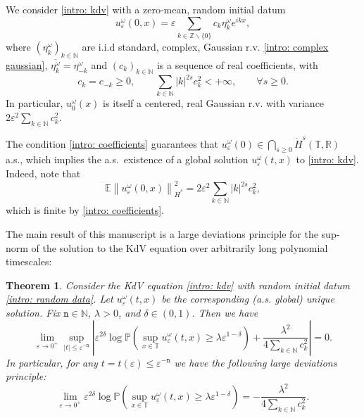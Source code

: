 \documentclass[a4paper,10pt,reqno]{article}
\theoremstyle{definition}
\theoremstyle{plain}
\newtheorem{theorem}[definition]{Theorem}
\theoremstyle{plain}
\theoremstyle{definition}
\theoremstyle{plain}
\theoremstyle{plain}
\theoremstyle{plain}
\theoremstyle{definition}
\theoremstyle{definition}
\newcommand{\norm}[1]{\left\lVert #1 \right\rVert}
\def \N{\mathbb N}
\def \Z{\mathbb Z}
\def \R{\mathbb R}
\def \P{{\mathbb P}}
\def \T{\mathbb{T}}
\def \E{\mathbb{E}}
\def \tn{\mathtt{n}}
\begin{document}
We consider \eqref{intro: kdv} with a zero-mean, random initial datum
\begin{equation} \label{intro: random data}
u_{\varepsilon}^{\omega}(0,x) = \varepsilon \sum_{k \in \Z \smallsetminus \{ 0 \}} c_k \eta_k^{\omega} e^{ikx},
\end{equation}
where $(\eta_k^{\omega})_{k \in \N}$ are i.i.d standard, complex, Gaussian r.v. \eqref{intro: complex gaussian}, $\overline{\eta_k^{\omega}} = \eta_{-k}^{\omega}$ and $(c_k)_{k \in \N}$ is a sequence of real coefficients, with
\begin{equation} \label{intro: coefficients}
c_k = c_{-k}\geq 0, \qquad \sum_{k \in \N} |k|^{2s} c_k^2 < +\infty, \qquad \forall s \ge 0.
\end{equation}
In particular, $u_0^{\omega}(x)$ is itself a centered, real Gaussian r.v. with variance $2\varepsilon^2 \sum_{k\in\N} c_k^2$.

\smallskip

The condition \eqref{intro: coefficients} guarantees that $u_{\varepsilon}^{\omega}(0)\in\bigcap_{s\geq 0} \dot{H}^s(\T,\R)$ a.s., which implies the a.s.~existence of a global solution $u_{\varepsilon}^{\omega}(t,x)$ to \eqref{intro: kdv}. Indeed, note that 
\begin{equation} \label{intro: average norm} 
\E \norm{u_{\varepsilon}^{\omega}(0,x)}_{\dot{H}^s}^2 = 2 \varepsilon^2 \sum_{k \in \N} |k|^{2s} c_k^2 ,
\end{equation}
which is finite by \eqref{intro: coefficients}.

\medskip

The main result of this manuscript is a large deviations principle for the sup-norm of the solution to the KdV equation over arbitrarily long polynomial timescales:

\begin{theorem} \label{thm:main_intro}
Consider the KdV equation  \eqref{intro: kdv} with random initial datum \eqref{intro: random data}. Let $u_{\varepsilon}^{\omega}(t,x)$ be the corresponding (a.s. global) unique solution.  Fix $\tn \in \N$, $\lambda > 0$, and $\delta \in (0,1)$. Then we have
\begin{equation} 
\lim_{\varepsilon\to 0^{+}} \sup_{|t|\leq \varepsilon^{-\tn}} \left \lvert \varepsilon^{2\delta} \log \P \left( \sup_{x \in \T} u_{\varepsilon}^{\omega}(t,x) \ge \lambda \varepsilon^{1-\delta} \right) +  \frac{\lambda^2}{4 \sum_{k\in\N} c_k^2} \right \rvert = 0.
\end{equation}
In particular, for any $t=t(\varepsilon)\leq \varepsilon^{-\tn}$ we have the following large deviations principle:
\begin{equation} \label{eq: limit ldp intro}
\lim_{\varepsilon \to 0^{+}} \varepsilon^{2\delta} \log \P \left( \sup_{x \in \T} u_{\varepsilon}^{\omega}(t,x) \ge \lambda \varepsilon^{1-\delta} \right) = - \frac{\lambda^2}{4 \sum_{k\in\N} c_k^2}.
\end{equation}

\end{theorem}
\end{document}
